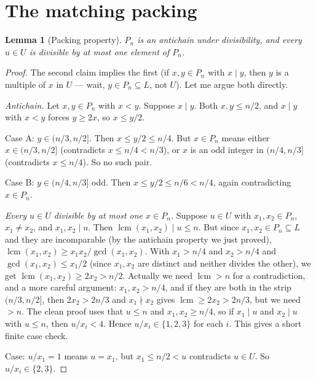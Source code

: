\documentclass{article}
\newtheorem{lemma}{Lemma}
\begin{document}
\section{The matching packing}

\begin{lemma}[Packing property]
\label{lem:packing}
$P_n$ is an antichain under divisibility, and every $u \in U$ is divisible by at most one element of $P_n$.
\end{lemma}

\begin{proof}
The second claim implies the first (if $x, y \in P_n$ with $x \mid y$, then $y$ is a multiple of $x$ in $U$ --- wait, $y \in P_n \subseteq L$, not $U$). Let me argue both directly.

\emph{Antichain.} Let $x, y \in P_n$ with $x < y$. Suppose $x \mid y$. Both $x, y \le n/2$, and $x \mid y$ with $x < y$ forces $y \ge 2x$, so $x \le y/2$.

Case A: $y \in (n/3, n/2]$. Then $x \le y/2 \le n/4$. But $x \in P_n$ means either $x \in (n/3, n/2]$ (contradicts $x \le n/4 < n/3$), or $x$ is an odd integer in $(n/4, n/3]$ (contradicts $x \le n/4$). So no such pair.

Case B: $y \in (n/4, n/3]$ odd. Then $x \le y/2 \le n/6 < n/4$, again contradicting $x \in P_n$.

\emph{Every $u \in U$ divisible by at most one $x \in P_n$.} Suppose $u \in U$ with $x_1, x_2 \in P_n$, $x_1 \ne x_2$, and $x_1, x_2 \mid u$. Then $\operatorname{lcm}(x_1, x_2) \mid u \le n$. But since $x_1, x_2 \in P_n \subseteq L$ and they are incomparable (by the antichain property we just proved), $\operatorname{lcm}(x_1, x_2) \ge x_1 x_2 / \gcd(x_1, x_2)$. With $x_1 > n/4$ and $x_2 > n/4$ and $\gcd(x_1, x_2) \le x_1 / 2$ (since $x_1, x_2$ are distinct and neither divides the other), we get $\operatorname{lcm}(x_1, x_2) \ge 2 x_2 > n/2$. Actually we need $\operatorname{lcm} > n$ for a contradiction, and a more careful argument: $x_1, x_2 > n/4$, and if they are both in the strip $(n/3, n/2]$, then $2 x_2 > 2n/3$ and $x_1 \nmid x_2$ gives $\operatorname{lcm} \ge 2 x_2 > 2n/3$, but we need $> n$. The clean proof uses that $u \le n$ and $x_1, x_2 \ge n/4$, so if $x_1 \mid u$ and $x_2 \mid u$ with $u \le n$, then $u / x_i < 4$. Hence $u / x_i \in \{1, 2, 3\}$ for each $i$. This gives a short finite case check.

Case: $u / x_1 = 1$ means $u = x_1$, but $x_1 \le n/2 < u$ contradicts $u \in U$. So $u / x_i \in \{2, 3\}$.


\end{proof}
\end{document}
